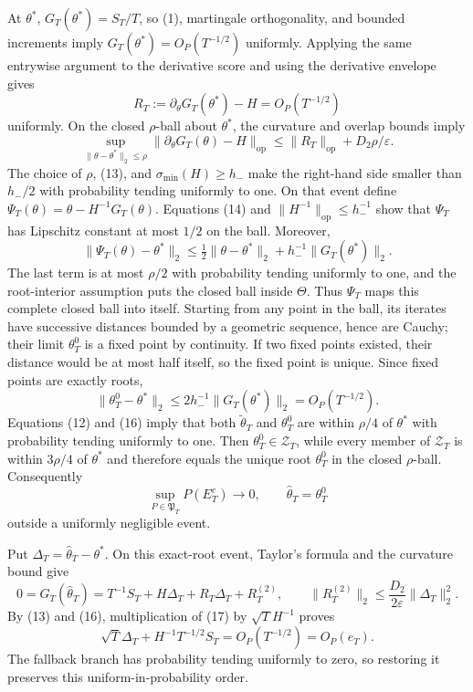 At \(\theta^*\), \(G_T(\theta^*)=S_T/T\), so (1), martingale orthogonality, and bounded increments imply \(G_T(\theta^*)=O_P(T^{-1/2})\) uniformly. Applying the same entrywise argument to the derivative score and using the derivative envelope gives
\[
 R_T:=\partial_\theta G_T(\theta^*)-H=O_P(T^{-1/2}) \tag{13}
\]
uniformly. On the closed \(\rho\)-ball about \(\theta^*\), the curvature and overlap bounds imply
\[
 \sup_{\|\theta-\theta^*\|_2\le\rho}
 \|\partial_\theta G_T(\theta)-H\|_{\mathrm{op}}
 \le\|R_T\|_{\mathrm{op}}+D_2\rho/\varepsilon. \tag{14}
\]
The choice of \(\rho\), (13), and \(\sigma_{\min}(H)\ge h_-\) make the right-hand side smaller than \(h_-/2\) with probability tending uniformly to one. On that event define \(\Psi_T(\theta)=\theta-H^{-1}G_T(\theta)\). Equations (14) and \(\|H^{-1}\|_{\mathrm{op}}\le h_-^{-1}\) show that \(\Psi_T\) has Lipschitz constant at most \(1/2\) on the ball. Moreover,
\[
 \|\Psi_T(\theta)-\theta^*\|_2
 \le\tfrac12\|\theta-\theta^*\|_2+h_-^{-1}\|G_T(\theta^*)\|_2. \tag{15}
\]
The last term is at most \(\rho/2\) with probability tending uniformly to one, and the root-interior assumption puts the closed ball inside \(\Theta\). Thus \(\Psi_T\) maps this complete closed ball into itself. Starting from any point in the ball, its iterates have successive distances bounded by a geometric sequence, hence are Cauchy; their limit \(\theta_T^0\) is a fixed point by continuity. If two fixed points existed, their distance would be at most half itself, so the fixed point is unique. Since fixed points are exactly roots,
\[
 \|\theta_T^0-\theta^*\|_2
 \le2h_-^{-1}\|G_T(\theta^*)\|_2=O_P(T^{-1/2}). \tag{16}
\]
Equations (12) and (16) imply that both \(\widetilde\theta_T\) and \(\theta_T^0\) are within \(\rho/4\) of \(\theta^*\) with probability tending uniformly to one. Then \(\theta_T^0\in\mathcal Z_T\), while every member of \(\mathcal Z_T\) is within \(3\rho/4\) of \(\theta^*\) and therefore equals the unique root \(\theta_T^0\) in the closed \(\rho\)-ball. Consequently
\[
 \sup_{P\in\mathfrak P_T}P(E_T^c)\to0, \qquad
 \widehat\theta_T=\theta_T^0
\]
outside a uniformly negligible event.

Put \(\Delta_T=\widehat\theta_T-\theta^*\). On this exact-root event, Taylor's formula and the curvature bound give
\[
 0=G_T(\widehat\theta_T)
 =T^{-1}S_T+H\Delta_T+R_T\Delta_T+R_T^{(2)},
 \qquad
 \|R_T^{(2)}\|_2\le\frac{D_2}{2\varepsilon}\|\Delta_T\|_2^2. \tag{17}
\]
By (13) and (16), multiplication of (17) by \(\sqrt T H^{-1}\) proves
\[
 \sqrt T\Delta_T+H^{-1}T^{-1/2}S_T
 =O_P(T^{-1/2})=O_P(e_T). \tag{18}
\]
The fallback branch has probability tending uniformly to zero, so restoring it preserves this uniform-in-probability order.

